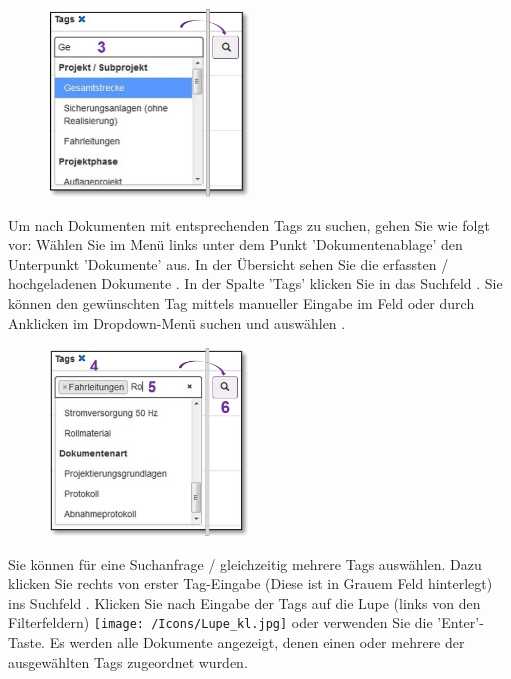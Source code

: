\begin{figure}
\vspace{-20pt}
\includegraphics[height=50mm]{../chapters/11_Dokumentenablage/pictures/11-2-8_DokTagHinzufuegen.jpg}
\end{figure}
Um nach Dokumenten mit entsprechenden Tags zu suchen, gehen Sie wie folgt vor:
Wählen Sie im Menü links unter dem Punkt 'Dokumentenablage' den Unterpunkt 'Dokumente' aus. In der Übersicht sehen Sie die erfassten / hochgeladenen Dokumente . In der Spalte 'Tags' klicken Sie in das Suchfeld . Sie können den gewünschten Tag mittels manueller Eingabe im Feld oder durch Anklicken im Dropdown-Menü suchen und auswählen .


\begin{figure}
\vspace{-15pt}
\includegraphics[height=50mm]{../chapters/11_Dokumentenablage/pictures/11-2-8_TagEingabe.jpg}
\end{figure}
Sie können für eine Suchanfrage / gleichzeitig mehrere Tags auswählen. Dazu klicken Sie rechts von erster Tag-Eingabe  (Diese ist in Grauem Feld hinterlegt) ins Suchfeld . Klicken Sie nach Eingabe der Tags auf die Lupe (links von den Filterfeldern) \texttt{[image: /Icons/Lupe\_kl.jpg]}  oder verwenden Sie die 'Enter'-Taste. Es werden alle Dokumente angezeigt, denen einen oder mehrere der ausgewählten Tags zugeordnet wurden.

